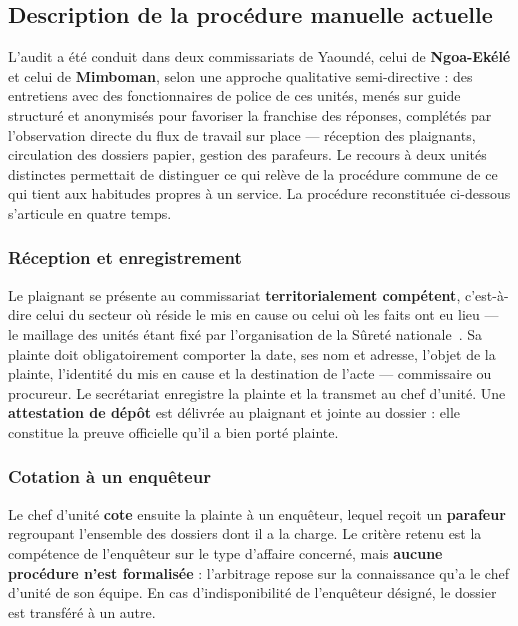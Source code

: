 \subsection{Description de la procédure manuelle actuelle}

L'audit a été conduit dans deux commissariats de Yaoundé, celui de \textbf{Ngoa-Ekélé} et celui de \textbf{Mimboman}, selon une approche qualitative semi-directive : des entretiens avec des fonctionnaires de police de ces unités, menés sur guide structuré et anonymisés pour favoriser la franchise des réponses, complétés par l'observation directe du flux de travail sur place — réception des plaignants, circulation des dossiers papier, gestion des parafeurs. Le recours à deux unités distinctes permettait de distinguer ce qui relève de la procédure commune de ce qui tient aux habitudes propres à un service. La procédure reconstituée ci-dessous s'articule en quatre temps.

\subsubsection*{Réception et enregistrement}

Le plaignant se présente au commissariat \textbf{territorialement compétent}, c'est-à-dire celui du secteur où réside le mis en cause ou celui où les faits ont eu lieu — le maillage des unités étant fixé par l'organisation de la Sûreté nationale~\cite{cameroun:dgsn}. Sa plainte doit obligatoirement comporter la date, ses nom et adresse, l'objet de la plainte, l'identité du mis en cause et la destination de l'acte — commissaire ou procureur. Le secrétariat enregistre la plainte et la transmet au chef d'unité. Une \textbf{attestation de dépôt} est délivrée au plaignant et jointe au dossier : elle constitue la preuve officielle qu'il a bien porté plainte.

\subsubsection*{Cotation à un enquêteur}

Le chef d'unité \textbf{cote} ensuite la plainte à un enquêteur, lequel reçoit un \textbf{parafeur} regroupant l'ensemble des dossiers dont il a la charge. Le critère retenu est la compétence de l'enquêteur sur le type d'affaire concerné, mais \textbf{aucune procédure n'est formalisée} : l'arbitrage repose sur la connaissance qu'a le chef d'unité de son équipe. En cas d'indisponibilité de l'enquêteur désigné, le dossier est transféré à un autre.

